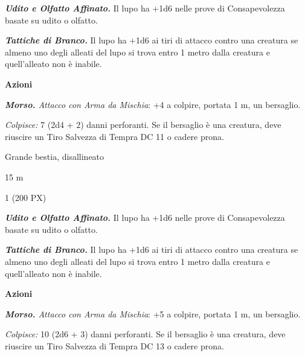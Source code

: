 \begin{multicols}{2}
{\emph{\textbf{Udito e Olfatto Affinato.}} Il lupo ha +1d6 nelle prove di Consapevolezza basate su udito o olfatto.

\emph{\textbf{Tattiche di Branco.}} Il lupo ha +1d6 ai tiri di attacco contro una creatura se almeno uno degli alleati del lupo si trova entro 1 metro dalla creatura e quell'alleato non è inabile.

\textbf{Azioni}

\emph{\textbf{Morso.} Attacco con Arma da Mischia}: +4 a colpire, portata 1 m, un bersaglio.

\emph{Colpisce:} 7 (2d4 + 2) danni perforanti. Se il bersaglio è una creatura, deve riuscire un Tiro Salvezza di Tempra DC 11 o cadere prona.

\begin{description}[noitemsep, topsep=0pt, parsep=0pt, partopsep=0pt, itemsep=1pt, leftmargin=2.35cm,  labelwidth=2.2cm, itemindent=0cm, listparindent=0pt] %
\setlength{\baselineskip}{10pt}
\item[\textbf{Taglia/Tipo}] Grande bestia, disallineato
\item[\textbf{Caratt.}] 
\item[\textbf{Punti Ferita}] 
\item[\textbf{Tiri Salvez.}] 
\item[\textbf{Movimento}] 15 m
\item[\textbf{Sfida}] 1 (200 PX)
\end{description}
\smallskip

\emph{\textbf{Udito e Olfatto Affinato.}} Il lupo ha +1d6 nelle prove di Consapevolezza basate su udito o olfatto.

\emph{\textbf{Tattiche di Branco.}} Il lupo ha +1d6 ai tiri di attacco contro una creatura se almeno uno degli alleati del lupo si trova entro 1 metro dalla creatura e quell'alleato non è inabile.

\textbf{Azioni}

\emph{\textbf{Morso.} Attacco con Arma da Mischia}: +5 a colpire, portata 1 m, un bersaglio.

\emph{Colpisce:} 10 (2d6 + 3) danni perforanti. Se il bersaglio è una creatura, deve riuscire un Tiro Salvezza di Tempra DC 13 o cadere prona.

}
\end{multicols}
